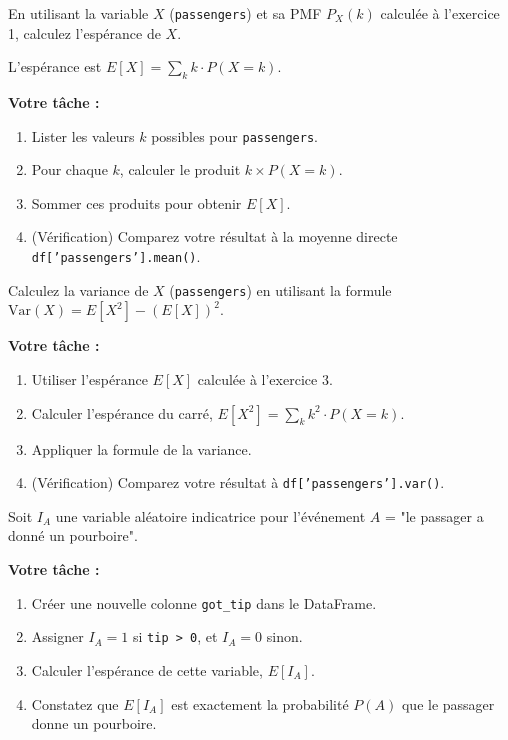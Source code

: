 \begin{exercicebox}
En utilisant la variable $X$ (\texttt{passengers}) et sa PMF $P_X(k)$ calculée à l'exercice 1, calculez l'espérance de $X$.

L'espérance est $E[X] = \sum_{k} k \cdot P(X=k)$.

\textbf{Votre tâche :}
\begin{enumerate}
    \item Lister les valeurs $k$ possibles pour \texttt{passengers}.
    \item Pour chaque $k$, calculer le produit $k \times P(X=k)$.
    \item Sommer ces produits pour obtenir $E[X]$.
    \item (Vérification) Comparez votre résultat à la moyenne directe \texttt{df['passengers'].mean()}.
\end{enumerate}
\end{exercicebox}

\begin{exercicebox}
Calculez la variance de $X$ (\texttt{passengers}) en utilisant la formule $\text{Var}(X) = E[X^2] - (E[X])^2$.

\textbf{Votre tâche :}
\begin{enumerate}
    \item Utiliser l'espérance $E[X]$ calculée à l'exercice 3.
    \item Calculer l'espérance du carré, $E[X^2] = \sum_{k} k^2 \cdot P(X=k)$.
    \item Appliquer la formule de la variance.
    \item (Vérification) Comparez votre résultat à \texttt{df['passengers'].var()}.
\end{enumerate}
\end{exercicebox}

\begin{exercicebox}
Soit $I_A$ une variable aléatoire indicatrice pour l'événement $A$ = "le passager a donné un pourboire".

\textbf{Votre tâche :}
\begin{enumerate}
    \item Créer une nouvelle colonne \texttt{got\_tip} dans le DataFrame.
    \item Assigner $I_A = 1$ si \texttt{tip > 0}, et $I_A = 0$ sinon.
    \item Calculer l'espérance de cette variable, $E[I_A]$.
    \item Constatez que $E[I_A]$ est exactement la probabilité $P(A)$ que le passager donne un pourboire.
\end{enumerate}
\end{exercicebox}

